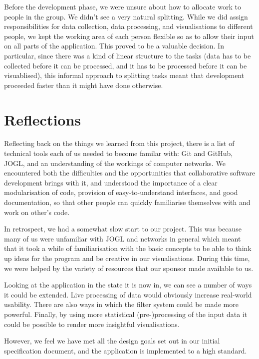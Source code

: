 \documentclass[12pt,a4paper]{article}
\begin{document}
		Before the development phase, we were unsure about how to allocate work to people in the group. We didn't see a very natural splitting. While we did assign responsibilities for data collection, data processing, and visualisations to different people, we kept the working area of each person flexible so as to allow their input on all parts of the application. This proved to be a valuable decision. In particular, since there was a kind of linear structure to the tasks (data has to be collected before it can be processed, and it has to be processed before it can be visuablised), this informal approach to splitting tasks meant that development proceeded faster than it might have done otherwise.

    \section*{Reflections}

		Reflecting back on the things we learned from this project, there is a list of technical tools each of us needed to become familar with: Git and GitHub, JOGL, and an understanding of the workings of computer networks. We encountered both the difficulties and the opportunities that collaborative software development brings with it, and understood the importance of a clear modularisation of code, provision of easy-to-understand interfaces, and good documentation, so that other people can quickly familiarise themselves with and work on other's code. 
		
		In retrospect, we had a somewhat slow start to our project. This was because many of us were unfamiliar with JOGL and networks in general which meant that it took a while of familiarisation with the basic concepts to be able to think up ideas for the program and be creative in our visualisations. During this time, we were helped by the variety of resources that our sponsor made available to us.
		
        Looking at the application in the state it is now in, we can see a number of ways it could be extended. Live processing of data would obviously increase real-world usability. There are also ways in which the filter system could be made more powerful. Finally, by using more statistical (pre-)processing of the input data it could be possible to render more insightful visualisations.
	
        However, we feel we have met all the design goals set out in our initial specification document, and the application is implemented to a high standard.
	
\end{document}
